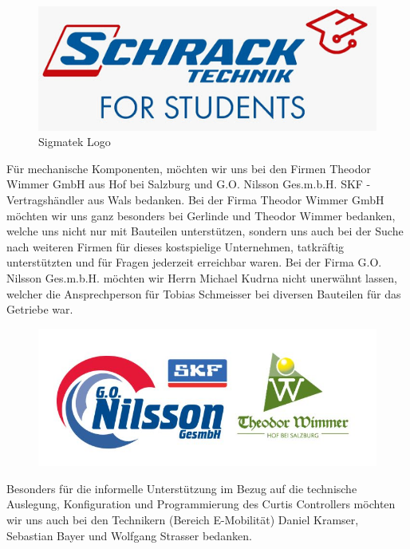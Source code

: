 \begin{figure}[H]
	\begin{center}
		\includegraphics[scale=0.5]{figures/allgemein/Schrack_Logo.jpg}
		\caption{Sigmatek Logo}
	\end{center}
\end{figure}

Für mechanische Komponenten, möchten wir uns bei den Firmen Theodor Wimmer GmbH aus Hof bei Salzburg und G.O. Nilsson Ges.m.b.H. SKF - Vertragshändler aus Wals bedanken. Bei der Firma Theodor Wimmer GmbH möchten wir uns ganz besonders bei Gerlinde und Theodor Wimmer bedanken, welche uns nicht nur mit Bauteilen unterstützen, sondern uns auch bei der Suche nach weiteren Firmen für dieses kostspielige Unternehmen, tatkräftig unterstützten und für Fragen jederzeit erreichbar waren. Bei der Firma G.O. Nilsson Ges.m.b.H. möchten wir Herrn Michael Kudrna nicht unerwähnt lassen, welcher die Ansprechperson für Tobias Schmeisser bei diversen Bauteilen für das Getriebe war.

\begin{figure} [H]
	\begin{center}
		\includegraphics[scale=0.5]{figures/mechanik/Sponsoren.jpg}		
	\end{center}
\end{figure}
\vspace{0,5cm}
	
Besonders für die informelle Unterstützung im Bezug auf die technische Auslegung, Konfiguration und Programmierung des Curtis Controllers möchten wir uns auch bei den Technikern (Bereich E-Mobilität) Daniel Kramser, Sebastian Bayer und Wolfgang Strasser bedanken.

